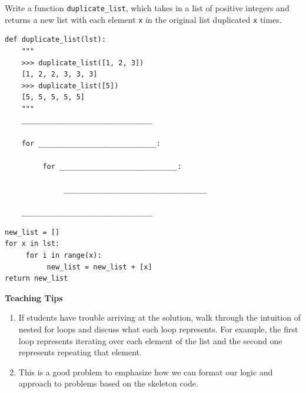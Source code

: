 \begin{blocksection}
\question Write a function \lstinline{duplicate_list}, which takes in a list of positive integers and returns a new list with each element \lstinline{x} in the original list duplicated \lstinline{x} times.

\begin{lstlisting}
def duplicate_list(lst):
    """
    >>> duplicate_list([1, 2, 3])
    [1, 2, 2, 3, 3, 3]
    >>> duplicate_list([5])
    [5, 5, 5, 5, 5]
    """
    _______________________________
    
    for ____________________________:

         for ____________________________:

              __________________________________

    _______________________________

\end{lstlisting}

\begin{solution}
\begin{lstlisting}
new_list = []
for x in lst:
     for i in range(x):
          new_list = new_list + [x]
return new_list
\end{lstlisting}
\end{solution}
\end{blocksection}

\begin{meta}
\textbf{Teaching Tips}
    \begin{enumerate}
            \item If students have trouble arriving at the solution, walk through the intuition of nested for loops
            and discuss what each loop represents. For example, the first loop represents iterating over each element
            of the list and the second one represents repeating that element.
            \item This is a good problem to emphasize how we can format our logic and approach to problems based on 
            the skeleton code.
    \end{enumerate}
\end{meta}


